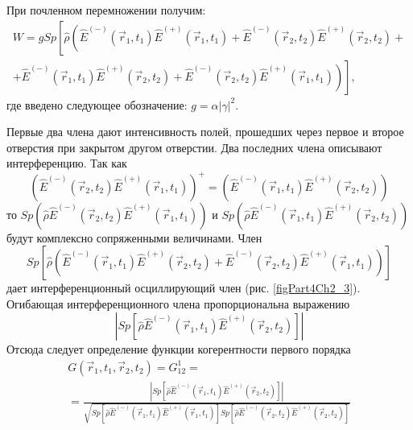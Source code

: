 При почленном перемножении получим:
\begin{eqnarray}
W = 
g Sp \left[\hat{\rho}
\left( 
\hat{E}^{(-)}\left(\vec{r}_1, t_1\right) \hat{E}^{(+)}\left(\vec{r}_1,
t_1\right) +
\hat{E}^{(-)}\left(\vec{r}_2, t_2\right) \hat{E}^{(+)}\left(\vec{r}_2,
t_2\right) +
\right.
\right.
\nonumber \\
\left.
\left.
+
\hat{E}^{(-)}\left(\vec{r}_1, t_1\right) \hat{E}^{(+)}\left(\vec{r}_2,
t_2\right) +
\hat{E}^{(-)}\left(\vec{r}_2, t_2\right) \hat{E}^{(+)}\left(\vec{r}_1,
t_1\right)
\right)
\right],
\label{eqCh4_12}
\end{eqnarray}
где введено следующее обозначение: $g = \alpha \left|\gamma\right|^2$.

Первые два члена дают интенсивность полей, прошедших через первое и
второе отверстия при закрытом другом отверстии. Два последних члена
описывают интерференцию. Так как  
\[
\left(\hat{E}^{(-)}\left(\vec{r}_2, t_2\right) \hat{E}^{(+)}\left(\vec{r}_1,
t_1\right)\right)^{+} = 
\left(\hat{E}^{(-)}\left(\vec{r}_1, t_1\right) \hat{E}^{(+)}\left(\vec{r}_2,
t_2\right)\right)
\]
то  
\(
Sp\left(\hat{\rho}\hat{E}^{(-)}\left(\vec{r}_2, t_2\right) \hat{E}^{(+)}\left(\vec{r}_1,
t_1\right)\right)
\)
и 
\(
Sp\left(\hat{\rho}\hat{E}^{(-)}\left(\vec{r}_1, t_1\right) \hat{E}^{(+)}\left(\vec{r}_2,
t_2\right)\right)
\)
будут комплексно сопряженными величинами. Член 
\[
Sp 
\left[
\hat{\rho}
\left(
\hat{E}^{(-)}\left(\vec{r}_1, t_1\right) \hat{E}^{(+)}\left(\vec{r}_2,
t_2\right) +
\hat{E}^{(-)}\left(\vec{r}_2, t_2\right) \hat{E}^{(+)}\left(\vec{r}_1,
t_1\right)
\right)
\right]
\]
дает
интерференционный осциллирующий член (рис. \ref{figPart4Ch2_3}). Огибающая
интерференционного члена пропорциональна выражению 
\begin{equation}
\left|
Sp \left[
\hat{\rho}
\hat{E}^{(-)}\left(\vec{r}_1, t_1\right) \hat{E}^{(+)}\left(\vec{r}_2,
t_2\right)
\right]
\right|
\label{eqCh4_13}
\end{equation}
Отсюда следует определение функции когерентности первого порядка
\begin{eqnarray}
G\left(\vec{r}_1, t_1, \vec{r}_2, t_2\right) = 
G_{12}^{1} = 
\nonumber \\
= \frac{\left|
Sp \left[
\hat{\rho}
\hat{E}^{(-)}\left(\vec{r}_1, t_1\right) \hat{E}^{(+)}\left(\vec{r}_2,
t_2\right)
\right]
\right|}
{\sqrt{
Sp \left[
\hat{\rho}
\hat{E}^{(-)}\left(\vec{r}_1, t_1\right) \hat{E}^{(+)}\left(\vec{r}_1,
t_1\right)
\right]
Sp \left[
\hat{\rho}
\hat{E}^{(-)}\left(\vec{r}_2, t_2\right) \hat{E}^{(+)}\left(\vec{r}_2,
t_2\right)
\right]
}}
\label{eqCh4_14}
\end{eqnarray}

